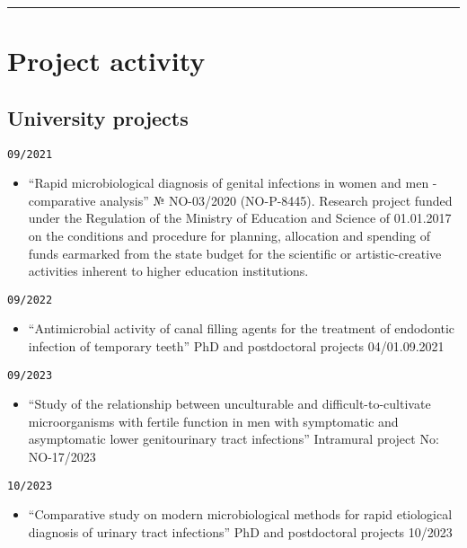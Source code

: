 \documentclass[
  12pt,
  letterpaper,
  DIV=11,
  numbers=noendperiod]{scrartcl}
\providecommand{\tightlist}{%
  \setlength{\itemsep}{0pt}\setlength{\parskip}{0pt}}\usepackage{longtable,booktabs,array}
\begin{document}
\begin{center}\rule{0.5\linewidth}{0.5pt}\end{center}

\section{Project activity}\label{project-activity}

\subsection{University projects}\label{university-projects}

\texttt{09/2021}

\begin{itemize}
\tightlist
\item
  ``Rapid microbiological diagnosis of genital infections in women and
  men - comparative analysis'' № NO-03/2020 (NO-P-8445). Research
  project funded under the Regulation of the Ministry of Education and
  Science of 01.01.2017 on the conditions and procedure for planning,
  allocation and spending of funds earmarked from the state budget for
  the scientific or artistic-creative activities inherent to higher
  education institutions.
\end{itemize}

\texttt{09/2022}

\begin{itemize}
\tightlist
\item
  ``Antimicrobial activity of canal filling agents for the treatment of
  endodontic infection of temporary teeth'' \textbar{} PhD and
  postdoctoral projects \textbar{} 04/01.09.2021
\end{itemize}

\texttt{09/2023}

\begin{itemize}
\tightlist
\item
  ``Study of the relationship between unculturable and
  difficult-to-cultivate microorganisms with fertile function in men
  with symptomatic and asymptomatic lower genitourinary tract
  infections'' \textbar{} Intramural project No: NO-17/2023
\end{itemize}

\texttt{10/2023}

\begin{itemize}
\tightlist
\item
  ``Comparative study on modern microbiological methods for rapid
  etiological diagnosis of urinary tract infections'' \textbar{} PhD and
  postdoctoral projects \textbar{} 10/2023
\end{itemize}
\end{document}
